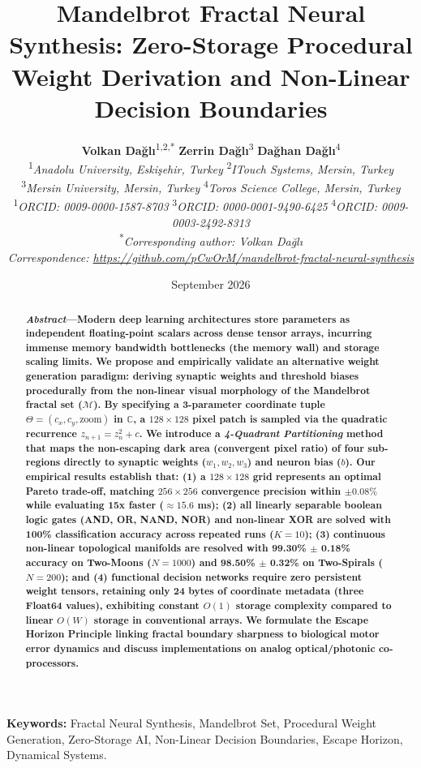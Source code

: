 \documentclass[10pt,journal,compsoc,twocolumn]{article}
\title{\textbf{\Large Mandelbrot Fractal Neural Synthesis: Zero-Storage Procedural Weight Derivation and Non-Linear Decision Boundaries}}
\author{
    \textbf{Volkan Dağlı}\textsuperscript{1,2,*} \quad \textbf{Zerrin Dağlı}\textsuperscript{3} \quad \textbf{Dağhan Dağlı}\textsuperscript{4} \\
    \textsuperscript{1}\textit{Anadolu University, Eskişehir, Turkey} \quad \textsuperscript{2}\textit{ITouch Systems, Mersin, Turkey} \\
    \textsuperscript{3}\textit{Mersin University, Mersin, Turkey} \quad \textsuperscript{4}\textit{Toros Science College, Mersin, Turkey} \\
    \textsuperscript{1}\textit{ORCID: 0009-0000-1587-8703} \quad \textsuperscript{3}\textit{ORCID: 0000-0001-9490-6425} \quad \textsuperscript{4}\textit{ORCID: 0009-0003-2492-8313} \\
    \textsuperscript{*}\textit{Corresponding author: Volkan Dağlı} \\
    \textit{Correspondence: \url{https://github.com/pCwOrM/mandelbrot-fractal-neural-synthesis}}
}
\date{September 2026}
\begin{document}
\maketitle

\begin{abstract}
\textbf{\textit{Abstract}---Modern deep learning architectures store parameters as independent floating-point scalars across dense tensor arrays, incurring immense memory bandwidth bottlenecks (the memory wall) and storage scaling limits. We propose and empirically validate an alternative weight generation paradigm: deriving synaptic weights and threshold biases procedurally from the non-linear visual morphology of the Mandelbrot fractal set ($\mathcal{M}$). By specifying a 3-parameter coordinate tuple $\Theta = (c_x, c_y, \text{zoom})$ in $\mathbb{C}$, a $128 \times 128$ pixel patch is sampled via the quadratic recurrence $z_{n+1} = z_n^2 + c$. We introduce a \textit{4-Quadrant Partitioning} method that maps the non-escaping dark area (convergent pixel ratio) of four sub-regions directly to synaptic weights ($w_1, w_2, w_3$) and neuron bias ($b$). Our empirical results establish that: (1) a $128 \times 128$ grid represents an optimal Pareto trade-off, matching $256 \times 256$ convergence precision within $\pm 0.08\%$ while evaluating 15x faster ($\approx 15.6$ ms); (2) all linearly separable boolean logic gates (AND, OR, NAND, NOR) and non-linear XOR are solved with 100\% classification accuracy across repeated runs ($K=10$); (3) continuous non-linear topological manifolds are resolved with 99.30\% $\pm$ 0.18\% accuracy on Two-Moons ($N=1000$) and 98.50\% $\pm$ 0.32\% on Two-Spirals ($N=200$); and (4) functional decision networks require zero persistent weight tensors, retaining only 24 bytes of coordinate metadata (three Float64 values), exhibiting constant $O(1)$ storage complexity compared to linear $O(W)$ storage in conventional arrays. We formulate the Escape Horizon Principle linking fractal boundary sharpness to biological motor error dynamics and discuss implementations on analog optical/photonic co-processors.}
\end{abstract}

\vspace{0.2cm}
\noindent\textbf{Keywords:} Fractal Neural Synthesis, Mandelbrot Set, Procedural Weight Generation, Zero-Storage AI, Non-Linear Decision Boundaries, Escape Horizon, Dynamical Systems.

\end{document}
